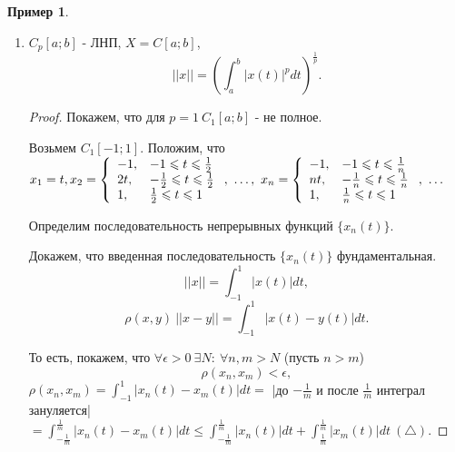 \documentclass{report}
\theoremstyle{definition}
\newtheorem{example}{Пример}
\begin{document}
\begin{example}
\begin{enumerate}
    \item $C_p[a;b]$ - ЛНП, $X = C[a;b]$,
          \begin{equation*}
            ||x|| = (\int_{a}^{b}|x(t)|^p dt)^\frac{1}{p}.
          \end{equation*}
          \begin{proof}
            Покажем, что для $p = 1 \ C_1[a;b]$ - не полное.

            Возьмем $C_1[-1;1]$. Положим, что $x_1 = t, \\ x_2 =
              \left\{
              \begin{array}{ll}
                -1, & -1 \leqslant t \leqslant \frac{1}{2}           \\
                2t, & -\frac{1}{2} \leqslant t \leqslant \frac{1}{2} \\
                1,  & \frac{1}{2} \leqslant t \leqslant 1
              \end{array}
              \right., \ \ldots, \ x_n =
              \left\{
              \begin{array}{ll}
                -1, & -1 \leqslant t \leqslant \frac{1}{n}           \\
                nt, & -\frac{1}{n} \leqslant t \leqslant \frac{1}{n} \\
                1,  & \frac{1}{n} \leqslant t \leqslant 1
              \end{array}
              \right., \ \ldots$

            Определим последовательность непрерывных функций $\{x_n(t)\}$.

            Докажем, что введенная последовательность $\{x_n(t)\}$ фундаментальная.
            \begin{equation*}
              ||x|| = \int_{-1}^{1}|x(t)|dt,
            \end{equation*}
            \begin{equation*}
              \rho(x,y) \ ||x-y|| = \int_{-1}^{1}|x(t) - y(t)|dt.
            \end{equation*}

            То есть, покажем, что $\forall \epsilon > 0 \ \exists N : \ \forall n,m > N$ (пусть $n>m$)
            \begin{equation*}
              \rho(x_n,x_m) < \epsilon,
            \end{equation*}
            $\rho(x_n,x_m) = \int_{-1}^{1}|x_n(t) - x_m(t)|dt =$ |до $-\frac{1}{m}$ и после $\frac{1}{m}$
            интеграл зануляется| $= \int_{-\frac{1}{m}}^{\frac{1}{m}}|x_n(t) - x_m(t)|dt \leqslant
              \int_{-\frac{1}{m}}^{\frac{1}{m}}|x_n(t)|dt + \int_{\frac{1}{m}}^{\frac{1}{m}}|x_m(t)|dt \ (\triangle)$.


\end{proof}
\end{enumerate}
\end{example}
\end{document}
